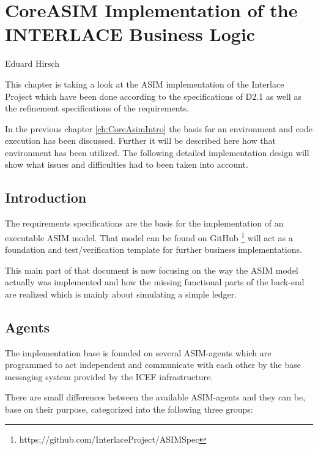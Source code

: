 \chapter{CoreASIM Implementation of the INTERLACE Business Logic}
\label{ch:CoreAsimImplementation}

\vspace{-1cm}
\begin{center}
Eduard Hirsch
\end{center}

This chapter is taking a look at the ASIM implementation of the Interlace Project which have been done according to the specifications of D2.1 as well as the refinement specifications of the requirements.

In the previous chapter \ref{ch:CoreAsimIntro} the basis for an environment and code execution has been discussed. Further it will be described here how that environment has been utilized. The following detailed implementation design will show what issues and difficulties had to been taken into account.


\section{Introduction}
\label{sec:impl_intro}

The requirements specifications are the basis for the implementation of an executable ASIM model. That model can be found on GitHub \footnote{https://github.com/InterlaceProject/ASIMSpec} will act as a foundation and test/verification template for further business implementations.

This main part of that document is now focusing on the way the ASIM model actually was implemented and how the missing functional parts of the back-end are realized which is mainly about simulating a simple ledger.

\section{Agents}
\label{sec:impl-agents}

The implementation base is founded on several ASIM-agents which are programmed to act independent and communicate with each other by the base messaging system provided by the ICEF infrastructure.

There are small differences between the available ASIM-agents and they can be, base on their purpose, categorized into the following three groups:

